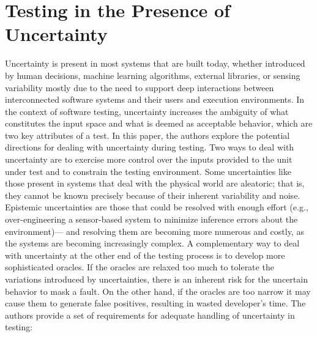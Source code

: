 \section{Testing in the Presence of Uncertainty \cite{Elbaum2014}}
Uncertainty is present in most systems that are built today, whether introduced by human decisions, machine learning algorithms, external libraries, or sensing variability mostly due to the need to support deep interactions between interconnected software systems and their users and execution environments. In the context of software testing, uncertainty increases the ambiguity of what constitutes the input space and what is deemed as acceptable behavior, which are two key attributes of a test. In this paper, the authors explore the potential directions for dealing with uncertainty during testing.
Two ways to deal with uncertainty are to exercise more control over the inputs provided to the unit under test and to constrain the testing environment. Some uncertainties like those present in systems that deal with the physical world are aleatoric; that is, they cannot be known precisely because of their inherent variability and noise. Epistemic uncertainties are those that could be resolved with enough effort (e.g., over-engineering a sensor-based system to minimize inference errors about the environment)— and resolving them are becoming more numerous and costly, as the systems are becoming increasingly complex. A complementary way to deal with uncertainty at the other end of the testing process is to develop more sophisticated oracles. If the oracles are relaxed too much to tolerate the variations introduced by uncertainties, there is an inherent risk for the uncertain behavior to mask a fault. On the other hand, if the oracles are too narrow it may cause them to generate false positives, resulting in wasted developer's time. The authors provide a set of requirements for adequate handling of uncertainty in testing:
